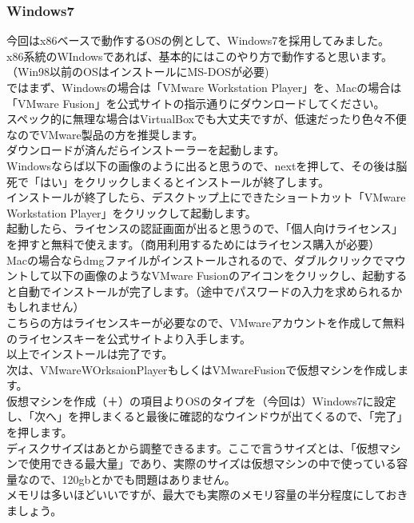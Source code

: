 \documentclass[b5paper,10pt]{jsarticle}
\begin{document}
\begin{multicols*}{3}
\subsubsection{Windows7}
今回はx86ベースで動作するOSの例として、Windows7を採用してみました。\\
x86系統のWIndowsであれば、基本的にはこのやり方で動作すると思います。（Win98以前のOSはインストールにMS-DOSが必要)\\
ではまず、Windowsの場合は「VMware Workstation Player」を、Macの場合は「VMware Fusion」を公式サイトの指示通りにダウンロードしてください。\\
スペック的に無理な場合はVirtualBoxでも大丈夫ですが、低速だったり色々不便なのでVMware製品の方を推奨します。\\
ダウンロードが済んだらインストーラーを起動します。\\
Windowsならば以下の画像のように出ると思うので、nextを押して、その後は脳死で「はい」をクリックしまくるとインストールが終了します。\\
インストールが終了したら、デスクトップ上にできたショートカット「VMware Workstation Player」をクリックして起動します。\\
起動したら、ライセンスの認証画面が出ると思うので、「個人向けライセンス」を押すと無料で使えます。（商用利用するためにはライセンス購入が必要）\\
Macの場合ならdmgファイルがインストールされるので、ダブルクリックでマウントして以下の画像のようなVMware Fusionのアイコンをクリックし、起動すると自動でインストールが完了します。（途中でパスワードの入力を求められるかもしれません）\\
こちらの方はライセンスキーが必要なので、VMwareアカウントを作成して無料のライセンスキーを公式サイトより入手します。\\
以上でインストールは完了です。\\
次は、VMwareWOrksaionPlayerもしくはVMwareFusionで仮想マシンを作成します。\\
仮想マシンを作成（＋）の項目よりOSのタイプを（今回は）Windows7に設定し、「次へ」を押しまくると最後に確認的なウインドウが出てくるので、「完了」を押します。\\
ディスクサイズはあとから調整できるます。ここで言うサイズとは、「仮想マシンで使用できる最大量」であり、実際のサイズは仮想マシンの中で使っている容量なので、120gbとかでも問題はありません。\\
メモリは多いほどいいですが、最大でも実際のメモリ容量の半分程度にしておきましょう。\\

\end{multicols*}
\end{document}
